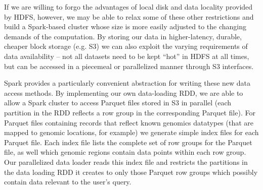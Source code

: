 \documentclass{acm_proc_article-sp}
\begin{document}
If we are willing to forgo the advantages of local disk and data locality provided by HDFS, however, we may be able to relax some of these other restrictions and build a Spark-based cluster whose size is more easily adjusted to the changing demands of the computation.  By storing our data in higher-latency, durable, cheaper block storage (e.g. S3) we can also exploit the varying requirements of data availability -- not all datasets need to be kept ``hot'' in HDFS at all times, but can be accessed in a piecemeal or parallelized manner through S3 interfaces.

Spark provides a particularly convenient abstraction for writing these new data access methods.  By implementing our own data-loading RDD, we are able to allow a Spark cluster to access Parquet files stored in S3 in parallel (each partition in the RDD reflects a row group in the corresponding Parquet file). For Parquet files containing records that reflect known genomics datatypes (that are mapped to genomic locations, for example) we generate simple index files for each Parquet file.  Each index file lists the complete set of row groups for the Parquet file, as well which genomic regions contain data points within each row group.  Our parallelized data loader reads this index file and restricts the partitions in the data loading RDD it creates to only those Parquet row groups which possibly contain data relevant to the user's query.

\end{document}
